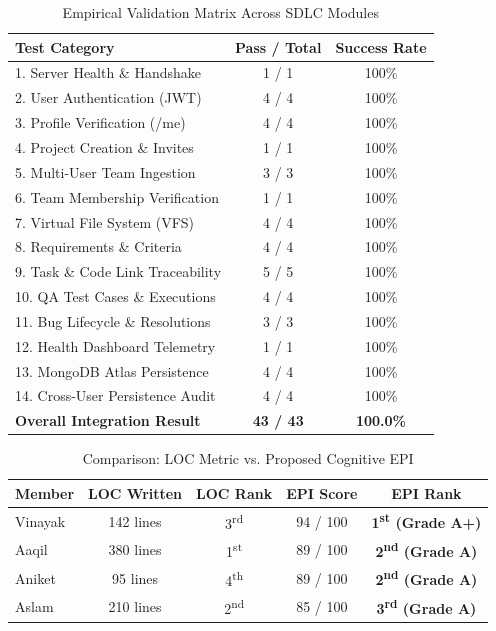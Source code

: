 \documentclass[conference]{IEEEtran}
\begin{document}
\begin{table}[htbp]
\caption{Empirical Validation Matrix Across SDLC Modules}
\begin{center}
\begin{tabular}{lcc}
\toprule
\textbf{Test Category} & \textbf{Pass / Total} & \textbf{Success Rate} \\
\midrule
1. Server Health \& Handshake & 1 / 1 & 100\% \\
2. User Authentication (JWT) & 4 / 4 & 100\% \\
3. Profile Verification (/me) & 4 / 4 & 100\% \\
4. Project Creation \& Invites & 1 / 1 & 100\% \\
5. Multi-User Team Ingestion & 3 / 3 & 100\% \\
6. Team Membership Verification & 1 / 1 & 100\% \\
7. Virtual File System (VFS) & 4 / 4 & 100\% \\
8. Requirements \& Criteria & 4 / 4 & 100\% \\
9. Task \& Code Link Traceability & 5 / 5 & 100\% \\
10. QA Test Cases \& Executions & 4 / 4 & 100\% \\
11. Bug Lifecycle \& Resolutions & 3 / 3 & 100\% \\
12. Health Dashboard Telemetry & 1 / 1 & 100\% \\
13. MongoDB Atlas Persistence & 4 / 4 & 100\% \\
14. Cross-User Persistence Audit & 4 / 4 & 100\% \\
\midrule
\textbf{Overall Integration Result} & \textbf{43 / 43} & \textbf{100.0\%} \\
\bottomrule
\end{tabular}
\end{center}
\end{table}

\begin{table}[htbp]
\caption{Comparison: LOC Metric vs. Proposed Cognitive EPI}
\begin{center}
\begin{tabular}{lcccc}
\toprule
\textbf{Member} & \textbf{LOC Written} & \textbf{LOC Rank} & \textbf{EPI Score} & \textbf{EPI Rank} \\
\midrule
Vinayak & 142 lines & 3\textsuperscript{rd} & 94 / 100 & \textbf{1\textsuperscript{st} (Grade A+)} \\
Aaqil & 380 lines & 1\textsuperscript{st} & 89 / 100 & \textbf{2\textsuperscript{nd} (Grade A)} \\
Aniket & 95 lines & 4\textsuperscript{th} & 89 / 100 & \textbf{2\textsuperscript{nd} (Grade A)} \\
Aslam & 210 lines & 2\textsuperscript{nd} & 85 / 100 & \textbf{3\textsuperscript{rd} (Grade A)} \\
\bottomrule
\end{tabular}
\end{center}
\end{table}
\end{document}
